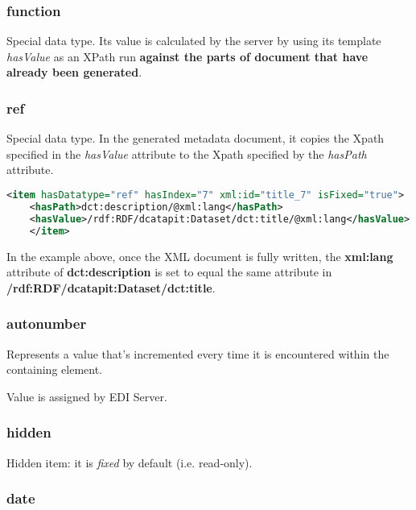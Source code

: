 
\subsubsection{function}
\label{function}

Special data type.
Its value is calculated by the server by using its template \textit{hasValue} as an XPath run \textbf{against the parts of document that have already been generated}.

\subsubsection{ref}
\label{ref}

Special data type.
In the generated metadata document, it copies the Xpath specified in the \textit{hasValue} attribute to the Xpath specified by the \textit{hasPath} attribute.

\begin{lstlisting}[language=xml]
	<item hasDatatype="ref" hasIndex="7" xml:id="title_7" isFixed="true">
	<hasPath>dct:description/@xml:lang</hasPath>
	<hasValue>/rdf:RDF/dcatapit:Dataset/dct:title/@xml:lang</hasValue>
	</item>
\end{lstlisting}

In the example above, once the XML document is fully written, the \textbf{xml:lang} attribute of \textbf{dct:description} is set to equal the same attribute in \textbf{/rdf:RDF/dcatapit:Dataset/dct:title}.

\subsubsection{autonumber}
\label{autonumber}

Represents a value that's incremented every time it is encountered within the containing element.

Value is assigned by EDI Server.

\subsubsection{hidden}
\label{hidden}

Hidden item: it is \textit{fixed} by default (i.e. read-only).

\subsubsection{date}
\label{date}

